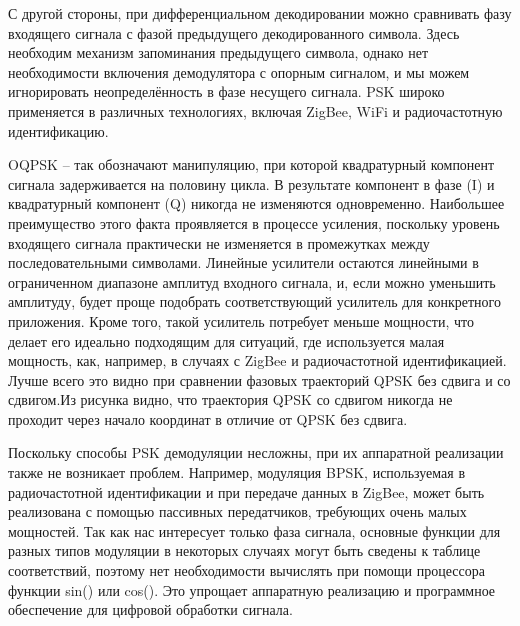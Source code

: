 \documentclass[12pt,a4paper]{report}
\begin{document}
С другой стороны, при дифференциальном декодировании можно сравнивать фазу входящего сигнала с фазой предыдущего декодированного символа. Здесь необходим механизм запоминания предыдущего символа, однако нет необходимости включения демодулятора с опорным сигналом, и мы можем игнорировать неопределённость в фазе несущего сигнала.
PSK широко применяется в различных технологиях, включая ZigBee, WiFi и радиочастотную идентификацию.

OQPSK – так обозначают манипуляцию, при которой квадратурный компонент сигнала задерживается на половину цикла. В результате компонент в фазе (I) и квадратурный компонент (Q) никогда не изменяются одновременно. Наибольшее преимущество этого факта проявляется в процессе усиления, поскольку уровень входящего сигнала практически не изменяется в промежутках между последовательными символами. Линейные усилители остаются линейными в ограниченном диапазоне амплитуд входного сигнала, и, если можно
уменьшить амплитуду, будет проще подобрать соответствующий усилитель для конкретного приложения. Кроме того, такой усилитель потребует меньше мощности, что делает его идеально подходящим для ситуаций, где используется малая мощность, как, например, в случаях с ZigBee и радиочастотной идентификацией. Лучше всего это видно при сравнении фазовых траекторий QPSK без сдвига и со сдвигом.Из рисунка видно, что траектория QPSK со сдвигом никогда не проходит через начало координат в отличие от QPSK без сдвига.

Поскольку способы PSK демодуляции несложны, при их аппаратной реализации также не возникает проблем. Например, модуляция BPSK, используемая в радиочастотной идентификации и при передаче данных в ZigBee, может быть реализована с помощью пассивных передатчиков, требующих очень малых мощностей. Так как нас интересует только фаза сигнала, основные функции для разных типов модуляции в некоторых случаях могут быть сведены к таблице соответствий, поэтому нет необходимости вычислять при помощи процессора функции sin() или cos(). Это упрощает аппаратную реализацию и программное обеспечение для цифровой обработки сигнала.
\end{document}
